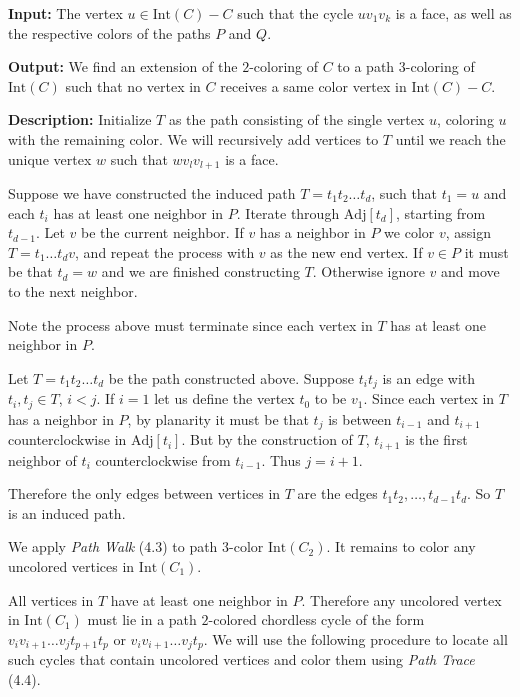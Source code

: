 \documentclass[letterpaper, 12pt]{article}
\theoremstyle{definition}
\theoremstyle{definition}
\theoremstyle{thm}
\theoremstyle{definition}
\begin{document}
\noindent\textbf{Input:} The vertex $u\in \text{Int}(C)-C$ such that the cycle
$uv_1v_k$ is a face, as well as the respective colors of the paths $P$ and $Q$.

\noindent\textbf{Output:} We find an extension of the $2$-coloring of $C$ to a
path $3$-coloring of $\text{Int}(C)$ such that no vertex in $C$ receives a same
color vertex in $\text{Int}(C)-C$.

\noindent\textbf{Description:} Initialize $T$ as the path consisting of the
single vertex $u$, coloring $u$ with the remaining color. We will recursively
add vertices to $T$ until we reach the unique vertex $w$ such that $wv_lv_{l+1}$
is a face.

Suppose we have constructed the induced path $T=t_1t_2\ldots t_d$, such that
$t_1=u$ and each $t_i$ has at least one neighbor in $P$.
Iterate through $\text{Adj}[t_d]$,
starting from $t_{d-1}$. Let $v$ be the current neighbor. If $v$ has a neighbor
in $P$ we color $v$, assign $T=t_1\ldots t_dv$, and repeat the process with $v$ as
the new end vertex. If $v\in P$ it must be that $t_d=w$ and we are finished
constructing $T$. Otherwise ignore $v$ and move to the next neighbor.

Note the process above must terminate since each vertex in $T$ has at least
one neighbor in $P$.

Let $T=t_1t_2\ldots t_d$ be the path constructed above. Suppose $t_it_j$ is an
edge with $t_i,t_j\in T$, $i<j$. If $i=1$ let us define the vertex $t_0$ to be
$v_1$. Since each vertex in $T$ has a neighbor in
$P$, by planarity it must be that $t_j$ is between $t_{i-1}$ and $t_{i+1}$
counterclockwise in $\text{Adj}[t_i]$. But by the construction of
$T$, $t_{i+1}$ is the first neighbor of $t_i$ counterclockwise from $t_{i-1}$.
Thus $j=i+1$.

Therefore the only edges between vertices in $T$ are the edges $t_1t_2,\ldots,
t_{d-1}t_d$. So $T$ is an induced path.

We apply \textit{Path Walk} (4.3) to path $3$-color $\text{Int}(C_2)$. It remains
to color any uncolored vertices in $\text{Int}(C_1)$.

All vertices in $T$ have at least one neighbor in $P$. Therefore any uncolored
vertex in $\text{Int}(C_1)$ must lie in a path $2$-colored chordless cycle of
the form $v_iv_{i+1}\ldots v_jt_{p+1}t_p$ or $v_iv_{i+1}\ldots v_jt_p$.
We will use the following procedure to locate all such cycles that contain
uncolored vertices and color them using \textit{Path Trace} (4.4).
\end{document}
